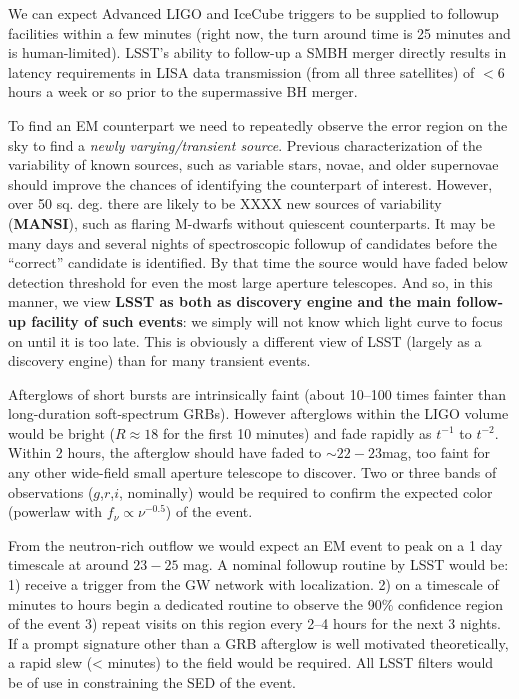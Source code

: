 \documentclass [11pt]{article}
\begin{document}
We can expect Advanced LIGO and IceCube triggers to be supplied to followup facilities within a few minutes (right now, the turn around time is 25 minutes and is human-limited). LSST's ability to follow-up a SMBH merger directly results in latency requirements in LISA data transmission (from all three satellites) of $< 6$ hours a week or so prior to the supermassive BH merger.  

To find an EM counterpart we need to repeatedly observe the error region on the sky to find a {\it newly varying/transient source}.  Previous characterization of the variability of known sources, such as variable stars, novae, and older supernovae should improve the chances of identifying the counterpart of interest. However, over 50 sq. deg. there are likely to be XXXX new sources of variability ({\bf MANSI}), such as flaring M-dwarfs without quiescent counterparts. It may be many days and several nights of spectroscopic followup of candidates before the ``correct'' candidate is identified. By that time the source would have faded below detection threshold for even the most large aperture telescopes. And so, in this manner, we view {\bf LSST as both as discovery engine and the main follow-up facility of such events}: we simply will not know which light curve to focus on until it is too late. This is obviously a different view of LSST (largely as a discovery engine) than  for many transient events.

Afterglows of short bursts are intrinsically faint (about 10--100 times fainter than long-duration soft-spectrum GRBs). However afterglows within the LIGO volume would be bright ($R\approx 18$ for the first 10 minutes) and fade rapidly as $t^{-1}$ to $t^{-2}$. Within 2 hours, the afterglow should have faded to $\sim22-23$mag, too faint for any other wide-field small aperture telescope to discover. Two or three bands of observations ($g$,$r$,$i$, nominally) would be required to confirm the expected color (powerlaw with $f_\nu \propto \nu^{-0.5}$) of the event.

From the neutron-rich outflow we would expect an EM event to peak on a 1 day timescale at around $23-25$ mag. A nominal followup routine by LSST would be: 1) receive a trigger from the GW network with localization. 2) on a timescale of minutes to hours begin a dedicated routine to observe the 90\% confidence region of the event 3) repeat visits on this region every 2--4 hours for the next 3 nights. If a prompt signature other than a GRB afterglow is well motivated theoretically, a rapid slew (< minutes) to the field would be required.  All LSST filters would be of use in constraining the SED of the event.
\end{document}
